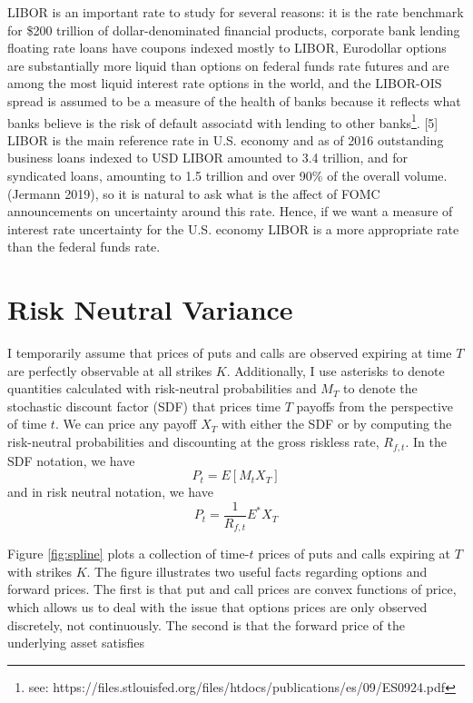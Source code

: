 \documentclass[11pt]{article}
\begin{document}
LIBOR is an important rate to study for several reasons: it is the rate benchmark for \$200 trillion of dollar-denominated financial products, corporate bank lending floating rate loans have coupons indexed mostly to LIBOR, Eurodollar options are substantially more liquid than options on federal funds rate futures and are among the most liquid interest rate options in the world, and the LIBOR-OIS spread is assumed to be a measure of the health of banks because it reflects what banks believe is the risk of default associatd with lending to other banks\footnote{see: https://files.stlouisfed.org/files/htdocs/publications/es/09/ES0924.pdf}.
[5] LIBOR is the main reference rate in U.S. economy and as of 2016 outstanding business loans indexed to USD LIBOR amounted to 3.4 trillion, and for syndicated loans, amounting to 1.5 trillion and over 90\% of the overall volume.  (Jermann 2019), so it is natural to ask what is the affect of FOMC announcements on uncertainty around this rate. Hence, if we want a measure of interest rate uncertainty for the U.S. economy LIBOR is a more appropriate rate than the federal funds rate.  \\

\section{Risk Neutral Variance}
{\color{blue}I temporarily assume that prices of puts and calls are observed expiring at time $T$ are perfectly observable at all strikes $K$. Additionally, I use asterisks to denote quantities calculated with risk-neutral probabilities and $M_{T}$ to denote the stochastic discount factor (SDF) that prices time $T$ payoffs from the perspective of time $t$. We can price any payoff $X_{T}$ with either the SDF or by computing the risk-neutral probabilities and discounting at the gross riskless rate, $R_{f, t}$. In the SDF notation, we have 
	\begin{equation*}
	P_{t} = E\left[M_{t}X_{T}\right]
	\end{equation*}
	and in risk neutral notation, we have 
	\begin{equation*}
	P_{t} = \dfrac{1}{R_{f,t}}E^{*}X_{T}
	\end{equation*}} 

Figure \ref{fig:spline} plots a collection of time-$t$ prices of puts and calls expiring at $T$ with strikes $K$. The figure illustrates two useful facts regarding options and forward prices. 
The first is that put and call prices are convex functions of price, which allows us to deal with the issue that options prices are only observed discretely, not continuously. The second is that the forward price of the underlying asset satisfies
\end{document}
